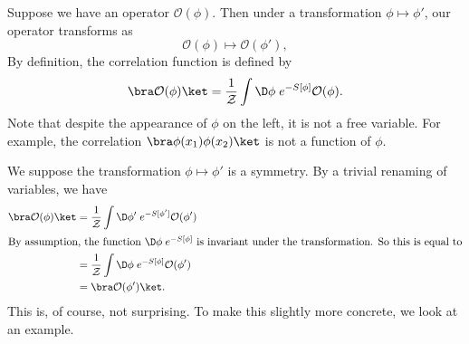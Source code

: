 \documentclass[a4paper]{article}
\begin{document}
Suppose we have an operator $\mathcal{O}(\phi)$. Then under a transformation $\phi \mapsto \phi'$, our operator transforms as
\[
  \mathcal{O}(\phi) \mapsto \mathcal{O}(\phi'),
\]
By definition, the correlation function is defined by
\[
  \bra \mathcal{O}(\phi)\ket = \frac{1}{\mathcal{Z}} \int \D \phi\;e^{-S[\phi]} \mathcal{O}(\phi).
\]
Note that despite the appearance of $\phi$ on the left, it is not a free variable. For example, the correlation $\bra \phi(x_1) \phi(x_2)\ket$ is not a function of $\phi$.

We suppose the transformation $\phi \mapsto \phi'$ is a symmetry. By a trivial renaming of variables, we have
\begin{align*}
  \bra \mathcal{O}(\phi)\ket &= \frac{1}{\mathcal{Z}} \int \D \phi'\; e^{-S[\phi']} \mathcal{O} (\phi')\\
  \intertext{By assumption, the function $\D \phi\;e^{-S[\phi]}$ is invariant under the transformation. So this is equal to}
  &= \frac{1}{\mathcal{Z}} \int \D \phi\; e^{-S[\phi]} \mathcal{O}(\phi')\\
  &= \bra \mathcal{O}(\phi')\ket.
\end{align*}
This is, of course, not surprising. To make this slightly more concrete, we look at an example.

\end{document}

